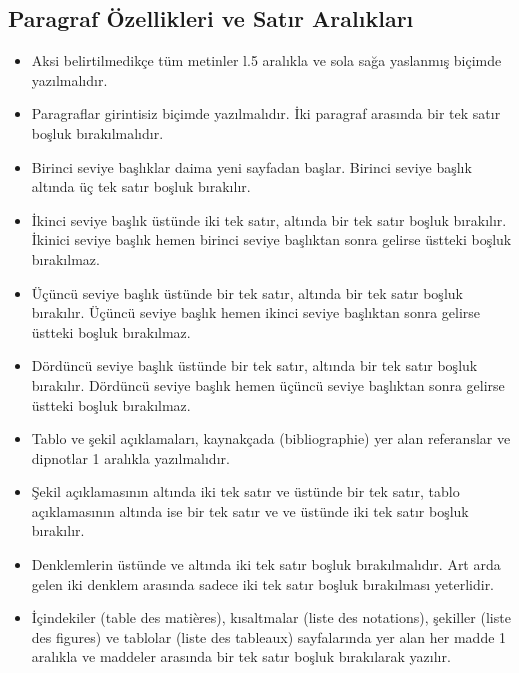 \subsection{Paragraf Özellikleri ve Satır Aralıkları}
\begin{itemize}
\item Aksi belirtilmedikçe tüm metinler l.5 aralıkla ve sola sağa yaslanmış biçimde yazılmalıdır. 
\item Paragraflar girintisiz biçimde yazılmalıdır. İki paragraf arasında bir tek satır boşluk  bırakılmalıdır.
\item Birinci seviye başlıklar daima yeni sayfadan başlar. Birinci seviye başlık altında üç tek satır boşluk bırakılır. 
\item İkinci seviye başlık üstünde iki tek satır, altında bir tek satır boşluk bırakılır. İkinici seviye başlık hemen birinci seviye başlıktan sonra gelirse üstteki boşluk bırakılmaz.
\item Üçüncü seviye başlık üstünde bir tek satır, altında bir tek satır boşluk bırakılır. Üçüncü seviye başlık hemen ikinci seviye başlıktan sonra gelirse üstteki boşluk bırakılmaz.
\item Dördüncü seviye başlık üstünde bir tek satır, altında bir tek satır boşluk bırakılır. Dördüncü seviye başlık hemen üçüncü seviye başlıktan sonra gelirse üstteki boşluk bırakılmaz.
\item Tablo ve şekil açıklamaları, kaynakçada (bibliographie) yer alan referanslar ve dipnotlar 1 aralıkla yazılmalıdır.
\item Şekil açıklamasının altında iki tek satır ve üstünde bir tek satır, tablo açıklamasının altında ise bir tek satır ve ve üstünde iki tek satır boşluk bırakılır.
\item Denklemlerin üstünde ve altında iki tek satır boşluk bırakılmalıdır. Art arda gelen iki denklem arasında sadece iki tek satır boşluk bırakılması yeterlidir.
\item İçindekiler (table des matières), kısaltmalar (liste des notations), şekiller (liste des figures) ve tablolar (liste des tableaux) sayfalarında yer alan her madde 1 aralıkla ve maddeler arasında bir tek satır boşluk bırakılarak yazılır.
\end{itemize}

